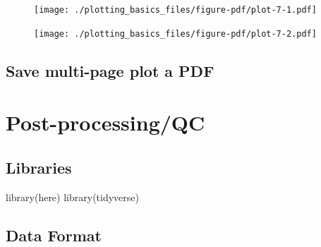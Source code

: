 \documentclass[
  letterpaper,
  DIV=11,
  numbers=noendperiod]{scrreprt}
\newenvironment{Shaded}{\begin{snugshade}}{\end{snugshade}}
\newcommand{\AttributeTok}[1]{\textcolor[rgb]{0.40,0.45,0.13}{#1}}
\newcommand{\ConstantTok}[1]{\textcolor[rgb]{0.56,0.35,0.01}{#1}}
\newcommand{\DecValTok}[1]{\textcolor[rgb]{0.68,0.00,0.00}{#1}}
\newcommand{\FunctionTok}[1]{\textcolor[rgb]{0.28,0.35,0.67}{#1}}
\newcommand{\NormalTok}[1]{\textcolor[rgb]{0.00,0.23,0.31}{#1}}
\newcommand{\SpecialCharTok}[1]{\textcolor[rgb]{0.37,0.37,0.37}{#1}}
\newcommand{\StringTok}[1]{\textcolor[rgb]{0.13,0.47,0.30}{#1}}
\begin{document}
\begin{figure}[H]

{\centering \texttt{[image: ./plotting\_basics\_files/figure-pdf/plot-7-1.pdf]}

}

\end{figure}

\begin{figure}[H]

{\centering \texttt{[image: ./plotting\_basics\_files/figure-pdf/plot-7-2.pdf]}

}

\end{figure}

\hypertarget{save-multi-page-plot-a-pdf}{%
\section{Save multi-page plot a PDF}\label{save-multi-page-plot-a-pdf}}

\begin{Shaded}
\end{Shaded}

\hypertarget{post-processingqc}{%
\chapter{Post-processing/QC}\label{post-processingqc}}

\hypertarget{libraries-1}{%
\section{Libraries}\label{libraries-1}}

\begin{Shaded}
\begin{Highlighting}[]
\FunctionTok{library}\NormalTok{(here)}
\FunctionTok{library}\NormalTok{(tidyverse)}
\end{Highlighting}
\end{Shaded}

\hypertarget{data-format}{%
\section{Data Format}\label{data-format}}
\end{document}
